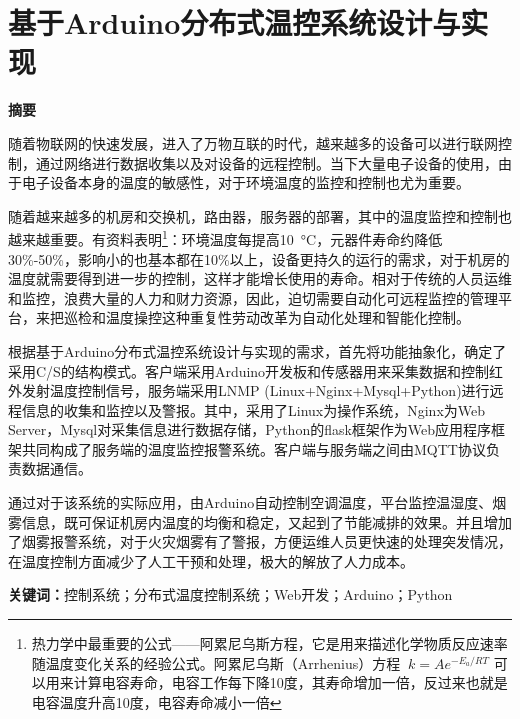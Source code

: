 \thispagestyle{abstractStyle} 

\section*{ \centering 基于Arduino分布式温控系统设计与实现}

\begin{center}
	\textbf{ 摘\hspace{1em}要}
\end{center}
\vspace{2em}

随着物联网的快速发展，进入了万物互联的时代，越来越多的设备可以进行联网控制，通过网络进行数据收集以及对设备的远程控制。当下大量电子设备的使用，由于电子设备本身的温度的敏感性，对于环境温度的监控和控制也尤为重要。

随着越来越多的机房和交换机，路由器，服务器的部署，其中的温度监控和控制也越来越重要。有资料表明\footnote{热力学中最重要的公式——阿累尼乌斯方程，它是用来描述化学物质反应速率随温度变化关系的经验公式。阿累尼乌斯（Arrhenius）方程 $\ k=Ae^{{{-E_{a}}/{RT}}}$ 可以用来计算电容寿命，电容工作每下降10度，其寿命增加一倍，反过来也就是电容温度升高10度，电容寿命减小一倍}：环境温度每提高\SI{10}{\degreeCelsius}，元器件寿命约降低30\%-50\%，影响小的也基本都在10\%以上，设备更持久的运行的需求，对于机房的温度就需要得到进一步的控制，这样才能增长使用的寿命。相对于传统的人员运维和监控，浪费大量的人力和财力资源，因此，迫切需要自动化可远程监控的管理平台，来把巡检和温度操控这种重复性劳动改革为自动化处理和智能化控制。

根据基于Arduino分布式温控系统设计与实现的需求，首先将功能抽象化，确定了采用C/S的结构模式。客户端采用Arduino开发板和传感器用来采集数据和控制红外发射温度控制信号，服务端采用LNMP (Linux+Nginx+Mysql+Python)进行远程信息的收集和监控以及警报。其中，采用了Linux为操作系统，Nginx为Web Server，Mysql对采集信息进行数据存储，Python的flask框架作为Web应用程序框架共同构成了服务端的温度监控报警系统。客户端与服务端之间由MQTT协议负责数据通信。

通过对于该系统的实际应用，由Arduino自动控制空调温度，平台监控温湿度、烟雾信息，既可保证机房内温度的均衡和稳定，又起到了节能减排的效果。并且增加了烟雾报警系统，对于火灾烟雾有了警报，方便运维人员更快速的处理突发情况，在温度控制方面减少了人工干预和处理，极大的解放了人力成本。


\vspace{1em}
\noindent
\textbf{关键词：}控制系统；分布式温度控制系统；Web开发；Arduino；Python



